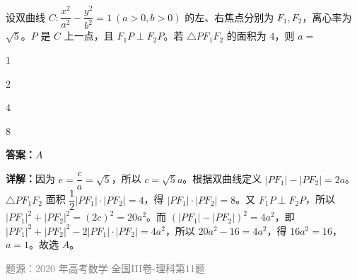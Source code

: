 \begin{question}
设双曲线 $C:\dfrac{x^2}{a^2}-\dfrac{y^2}{b^2}=1\ (a>0,b>0)$ 的左、右焦点分别为 $F_1,F_2$，离心率为 $\sqrt{5}$。$P$ 是 $C$ 上一点，且 $F_1P\perp F_2P$。若 $\triangle PF_1F_2$ 的面积为 $4$，则 $a=$
\begin{choices}
\item $1$
\item $2$
\item $4$
\item $8$
\end{choices}
\begin{solution}
\textbf{答案：}$A$

\textbf{详解：}因为 $e=\dfrac{c}{a}=\sqrt{5}$，所以 $c=\sqrt{5}a$。根据双曲线定义 $|PF_1|-|PF_2|=2a$。$\triangle PF_1F_2$ 面积 $\dfrac12|PF_1|\cdot|PF_2|=4$，得 $|PF_1|\cdot|PF_2|=8$。又 $F_1P\perp F_2P$，所以 $|PF_1|^2+|PF_2|^2=(2c)^2=20a^2$。而 $(|PF_1|-|PF_2|)^2=4a^2$，即 $|PF_1|^2+|PF_2|^2-2|PF_1|\cdot|PF_2|=4a^2$，所以 $20a^2-16=4a^2$，得 $16a^2=16$，$a=1$。故选 $A$。

\textcolor{gray}{\footnotesize 题源：2020 年高考数学 全国III卷-理科第11题}
\end{solution}
\end{question}


